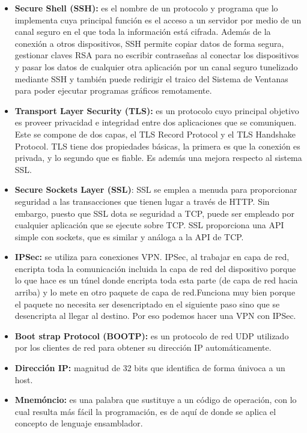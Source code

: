 \documentclass[a4paper,11pt]{article}
\begin{document}
\begin{itemize}
\item \textbf{Secure Shell (SSH):} es el nombre de un protocolo y programa que lo implementa cuya principal función es el acceso a un servidor por medio de un canal seguro en el que toda la información está cifrada. Además de la conexión a otros dispositivos, SSH permite copiar datos de forma segura, gestionar claves RSA para no escribir contraseñas al conectar los dispositivos y pasar los datos de cualquier otra aplicación por un canal seguro tunelizado mediante SSH y también puede redirigir el traico del Sistema de Ventanas para poder ejecutar programas gráficos remotamente.

\item \textbf{Transport Layer Security (TLS):} es un protocolo cuyo principal objetivo es proveer privacidad e integridad entre dos aplicaciones que se comuniquen. Este se compone de dos capas, el TLS Record Protocol y el TLS Handshake Protocol. TLS tiene dos propiedades básicas, la primera es que la conexión  es privada, y lo segundo que es fiable. Es además una mejora respecto al sistema SSL.

\item \textbf{Secure Sockets Layer (SSL)}: SSL se emplea a menuda para proporcionar seguridad a las transacciones que tienen lugar a través de HTTP. Sin embargo, puesto que SSL dota se seguridad a TCP, puede ser empleado por cualquier aplicación que se ejecute sobre TCP. SSL proporciona una API simple con sockets, que es similar y análoga a la API de TCP.

\item \textbf{IPSec:} se utiliza para conexiones VPN. IPSec, al trabajar en capa de red, encripta toda la comunicación incluida la capa de red del dispositivo porque lo que hace es un túnel donde encripta toda esta parte (de capa de red hacia arriba) y lo mete en otro paquete de capa de red.Funciona muy bien porque el paquete no necesita ser desencriptado en el siguiente paso sino que se desencripta al llegar al destino. Por eso podemos hacer una VPN con IPSec.

\item \textbf{Boot strap Protocol (BOOTP):} es un protocolo de red UDP utilizado por los clientes de red para obtener su dirección IP automáticamente.

\item \textbf{Dirección IP:} magnitud de 32 bits que identifica de forma únivoca a un host.

\item \textbf{Mnemóncio:} es una palabra que sustituye a un código de operación, con lo cual resulta más fácil la programación, es de aquí de donde se aplica el concepto de lenguaje ensamblador.
\end{itemize}
\end{document}
